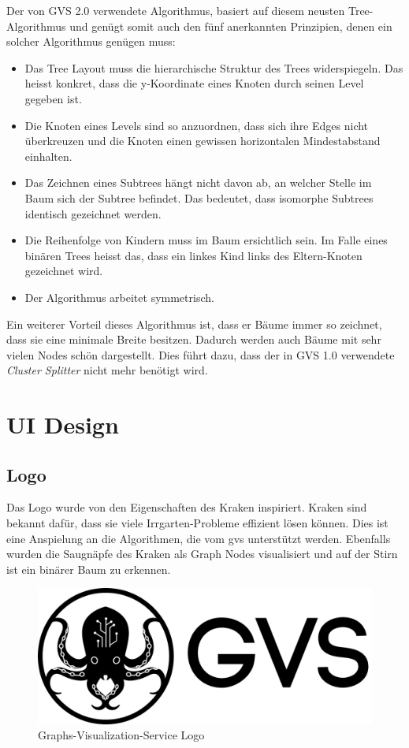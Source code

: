 \documentclass[11pt,a4paper,english,oneside]{book}
\numberwithin{equation}{chapter}
\begin{document}
	Der von GVS 2.0 verwendete Algorithmus, basiert auf diesem neusten Tree-Algorithmus und genügt somit auch den fünf anerkannten Prinzipien, denen ein solcher Algorithmus genügen muss:
	
	\begin{itemize}
		\item Das Tree Layout muss die hierarchische Struktur des Trees widerspiegeln. Das heisst konkret, dass die y-Koordinate eines Knoten durch seinen Level gegeben ist.
		\item Die Knoten eines Levels sind so anzuordnen, dass sich ihre Edges nicht überkreuzen und die Knoten einen gewissen horizontalen Mindestabstand einhalten.
		\item Das Zeichnen eines Subtrees hängt nicht davon ab, an welcher Stelle im Baum sich der Subtree befindet. Das bedeutet, dass isomorphe Subtrees identisch gezeichnet werden.
		\item Die Reihenfolge von Kindern muss im Baum ersichtlich sein. Im Falle eines binären Trees heisst das, dass ein linkes Kind links des Eltern-Knoten gezeichnet wird.
		\item Der Algorithmus arbeitet symmetrisch.
	\end{itemize}
	
	Ein weiterer Vorteil dieses Algorithmus ist, dass er Bäume immer so zeichnet, dass sie eine minimale Breite besitzen. Dadurch werden auch Bäume mit sehr vielen Nodes schön dargestellt. Dies führt dazu, dass der in GVS 1.0 \cite{gvs1} verwendete \textit{Cluster Splitter} nicht mehr benötigt wird. 
	
	\section{UI Design}
	
	\subsection{Logo}
	Das Logo wurde von den Eigenschaften des Kraken \cite{kraken} inspiriert. Kraken sind bekannt dafür, dass sie viele Irrgarten-Probleme effizient lösen können. Dies ist eine Anspielung an die Algorithmen, die vom \gls{gvs} unterstützt werden. Ebenfalls wurden die Saugnäpfe des Kraken als Graph Nodes visualisiert und auf der Stirn ist ein binärer Baum zu erkennen. 
	
	\begin{figure}[h!]
		\centering
		\includegraphics[width=0.5\linewidth]{assets/images/logo}
		\caption[GVS Logo]{Graphs-Visualization-Service Logo}
		\label{fig:logo}
	\end{figure}
	
\end{document}
